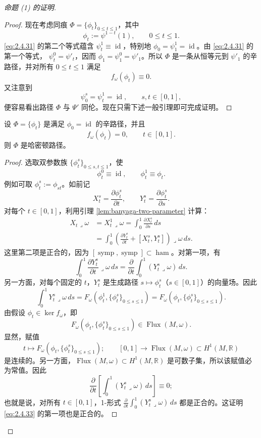 \begin{proof}[命题 (1) 的证明]
\begin{proof}
现在考虑同痕 $\Phi=\{\phi_t\}_{0\le t\le1}$，其中
\[
  \phi_t:=\psi^{1-t}(1),
  \qquad0\le t\le1.
\]
\eqref{eq:2.4.31} 的第二个等式蕴含 $\psi_t^1\equiv\operatorname{id}$，特别地
$\phi_0=\psi_1^1=\operatorname{id}$。由 \eqref{eq:2.4.31} 的第一个等式，
$\psi_t^0=\psi'_t$，因而 $\phi_1=\psi_1^0=\psi'_1$。所以 $\Phi$ 是一条从恒等元到 $\psi'_1$ 的辛路径，并对所有 $0\le t\le1$ 满足
\[
  f_\omega(\phi_t)\equiv0.
\]
又注意到
\[
  \psi_0^s=\psi_t^1=\operatorname{id},
  \qquad s,t\in[0,1],
\]
便容易看出路径 $\Phi$ 与 $\Psi'$ 同伦。现在只需下述一般引理即可完成证明。
\end{proof}

\begin{lemma}
\label{lem:path-in-kernel-hamiltonian}
设 $\Phi=\{\phi_t\}$ 是满足 $\phi_0=\operatorname{id}$ 的辛路径，并且
\[
  f_\omega(\phi_t)=0,
  \qquad t\in[0,1].
\]
则 $\Phi$ 是哈密顿路径。
\end{lemma}

\begin{proof}
选取双参数族 $\{\phi_t^s\}_{0\le s,t\le1}$，使
\[
  \phi_t^0\equiv\operatorname{id},
  \qquad \phi_t^1\equiv\phi_t.
\]
例如可取 $\phi_t^s:=\phi_{st}$。如前记
\[
  X_t^s=\frac{\partial\phi_t^s}{\partial t},
  \qquad Y_t^s=\frac{\partial\phi_t^s}{\partial s}.
\]
对每个 $t\in[0,1]$，利用引理 \ref{lem:banyaga-two-parameter} 计算：
\begin{equation}
\begin{aligned}
 X_t\mathbin{\lrcorner}\omega
 &=X_t^1\mathbin{\lrcorner}\omega
  =\int_0^1\frac{\partial X_t^s}{\partial s}\,ds\\
 &=\int_0^1\left(\frac{\partial Y_t^s}{\partial t}
   +[X_t^s,Y_t^s]\right)\mathbin{\lrcorner}\omega\,ds.
\end{aligned}
\label{eq:2.4.33}
\end{equation}
这里第二项是正合的，因为
$[\operatorname{symp},\operatorname{symp}]\subset\operatorname{ham}$。对第一项，有
\[
  \int_0^1\frac{\partial Y_t^s}{\partial t}
  \mathbin{\lrcorner}\omega\,ds
  =\frac\partial{\partial t}\int_0^1
  (Y_t^s\mathbin{\lrcorner}\omega)\,ds.
\]
另一方面，对每个固定的 $t$，$Y_t^s$ 是生成路径
$s\mapsto\phi_t^s$（$s\in[0,1]$）的向量场。因此
\[
 \int_0^1Y_t^s\mathbin{\lrcorner}\omega\,ds
 =F_\omega(\phi_t^1,\{\phi_t^s\}_{0\le s\le1})
 =F_\omega(\phi_t,\{\phi_t^s\}_{0\le s\le1}).
\]
由假设 $\phi_t\in\ker f_\omega$，即
\[
  F_\omega(\phi_t,\{\phi_t^s\}_{0\le s\le1})
  \in\operatorname{Flux}(M,\omega).
\]
显然，赋值
\[
 t\longmapsto F_\omega(\phi_t,\{\phi_t^s\}_{0\le s\le1});
 \qquad[0,1]\longrightarrow\operatorname{Flux}(M,\omega)
 \subset H^1(M,\mathbb R)
\]
是连续的。另一方面，$\operatorname{Flux}(M,\omega)\subset H^1(M,\mathbb R)$ 是可数子集，所以该赋值必为常值。因此
\[
 \frac\partial{\partial t}\left[\int_0^1
  (Y_t^s\mathbin{\lrcorner}\omega)\,ds\right]\equiv0;
\]
也就是说，对所有 $t\in[0,1]$，1-形式
$\frac\partial{\partial t}\int_0^1(Y_t^s\mathbin{\lrcorner}\omega)\,ds$
都是正合的。这证明 \eqref{eq:2.4.33} 的第一项也是正合的。


\end{proof}
\end{proof}

